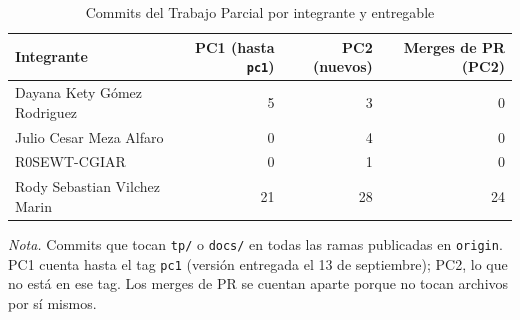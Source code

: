 \begin{table}[H]
\caption{Commits del Trabajo Parcial por integrante y entregable}\label{tab:commits-autor}
\footnotesize
\begin{tabular}{@{}lrrr@{}}
\toprule
\textbf{Integrante} & \textbf{PC1 (hasta \texttt{pc1})} & \textbf{PC2 (nuevos)} & \textbf{Merges de PR (PC2)} \\
\midrule
Dayana Kety Gómez Rodriguez & 5 & 3 & 0 \\
Julio Cesar Meza Alfaro & 0 & 4 & 0 \\
R0SEWT-CGIAR & 0 & 1 & 0 \\
Rody Sebastian Vilchez Marin & 21 & 28 & 24 \\
\bottomrule
\end{tabular}

{\footnotesize\textit{Nota.} Commits que tocan \texttt{tp/} o \texttt{docs/} en todas las ramas publicadas en \texttt{origin}. PC1 cuenta hasta el tag \texttt{pc1} (versión entregada el 13 de septiembre); PC2, lo que no está en ese tag. Los merges de PR se cuentan aparte porque no tocan archivos por sí mismos.\par}
\end{table}

